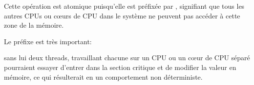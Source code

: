 Cette opération est atomique puisqu'elle est préfixée par , signifiant que
tous les autres CPUs ou c\oe{}urs de CPU dans le système ne peuvent pas accéder à cette
zone de la mémoire.

Le préfixe  est très important:

sans lui deux threads, travaillant chacune sur un CPU ou un c\oe ur de CPU séparé pourraient
essayer d'entrer dans la section critique et de modifier la valeur en mémoire, ce qui
résulterait en un comportement non déterministe.


